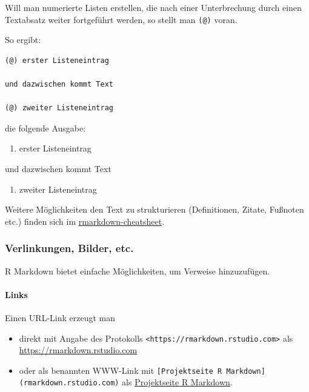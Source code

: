 \documentclass[
]{article}
\providecommand{\tightlist}{%
  \setlength{\itemsep}{0pt}\setlength{\parskip}{0pt}}
\begin{document}
Will man numerierte Listen erstellen, die nach einer Unterbrechung durch
einen Textabsatz weiter fortgeführt werden, so stellt man \texttt{(@)}
voran.

So ergibt:

\begin{verbatim}
(@) erster Listeneintrag

und dazwischen kommt Text

(@) zweiter Listeneintrag
\end{verbatim}

die folgende Ausgabe:

\begin{enumerate}
\def\labelenumi{(\arabic{enumi})}
\tightlist
\item
  erster Listeneintrag
\end{enumerate}

und dazwischen kommt Text

\begin{enumerate}
\def\labelenumi{(\arabic{enumi})}
\setcounter{enumi}{1}
\tightlist
\item
  zweiter Listeneintrag
\end{enumerate}

Weitere Möglichkeiten den Text zu strukturieren (Definitionen, Zitate,
Fußnoten etc.) finden sich im
\href{https://github.com/rstudio/cheatsheets/raw/master/rmarkdown-2.0.pdf}{rmarkdown-cheatsheet}.

\hypertarget{verlinkungen-bilder-etc.}{%
\subsubsection{Verlinkungen, Bilder,
etc.}\label{verlinkungen-bilder-etc.}}

R Markdown bietet einfache Möglichkeiten, um Verweise hinzuzufügen.

\hypertarget{links}{%
\paragraph{Links}\label{links}}

Einen URL-Link erzeugt man

\begin{itemize}
\tightlist
\item
  direkt mit Angabe des Protokolls
  \texttt{\textless{}https://rmarkdown.rstudio.com\textgreater{}} als
  \url{https://rmarkdown.rstudio.com}
\item
  oder als benannten WWW-Link mit
  \texttt{{[}Projektseite\ R\ Markdown{]}(rmarkdown.rstudio.com)} als
  \href{rmarkdown.rstudio.com}{Projektseite R Markdown}.
\end{itemize}
\end{document}
